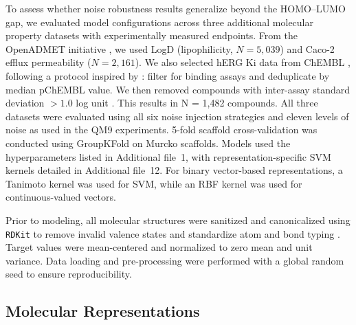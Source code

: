 \documentclass[pdflatex,sn-basic]{sn-jnl}%
\theoremstyle{thmstyleone}%
\theoremstyle{thmstyletwo}%
\theoremstyle{thmstylethree}%
\begin{document}
To assess whether noise robustness results generalize beyond the HOMO--LUMO gap, we evaluated model configurations across three additional molecular property datasets with experimentally measured endpoints. From the OpenADMET initiative \citep{openadmet}, we used LogD (lipophilicity, $N = 5{,}039$) and Caco-2 efflux permeability ($N = 2{,}161$). We also selected hERG Ki data from ChEMBL \citep{Gaulton2017}, following a protocol inspired by \citet{landrum2024}: filter for binding assays and deduplicate by median pChEMBL value. We then removed compounds with inter-assay standard deviation $> 1.0$ log unit \citep{Zdrazil2023}. This results in N = 1,482 compounds. All three datasets were evaluated using all six noise injection strategies and eleven levels of noise as used in the QM9 experiments. 5-fold scaffold cross-validation was conducted using GroupKFold on Murcko scaffolds. Models used the hyperparameters listed in Additional file~1, with representation-specific SVM kernels detailed in Additional file~12. For binary vector-based representations, a Tanimoto kernel was used for SVM, while an RBF kernel was used for continuous-valued vectors. 

Prior to modeling, all molecular structures were sanitized and canonicalized using \texttt{RDKit} to remove invalid valence states and standardize atom and bond typing \citep{rdkit}. Target values were mean-centered and normalized to zero mean and unit variance. Data loading and pre-processing were performed with a global random seed to ensure reproducibility.

\subsection{Molecular Representations}
\end{document}
